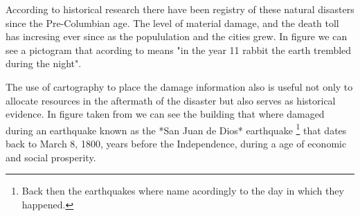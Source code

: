 According to historical research there have been registry of these natural disasters since the Pre-Columbian age. The level of material damage, and the death toll has incresing ever since as the popululation and the cities grew. In figure \cite{fig:codice} we can see a pictogram that acording to \cite{sismosmexico} means "in the year 11 rabbit the earth trembled during the night".\\


\begin{figure}[h]
  \begin{center}
  \end{center}
\end{figure}

The use of cartography to place the damage information also is useful not only to allocate resources in the aftermath of the disaster but also serves as historical evidence. In figure \cite{fig:quake1800} taken from \cite{AG3316} we can see the building that where damaged during an earthquake known as the *San Juan de Dios* earthquake \footnote{Back then the earthquakes where name acordingly to the day in which they happened.} that dates back to March 8, 1800, years before the Independence, during a age of economic and social prosperity.\\

